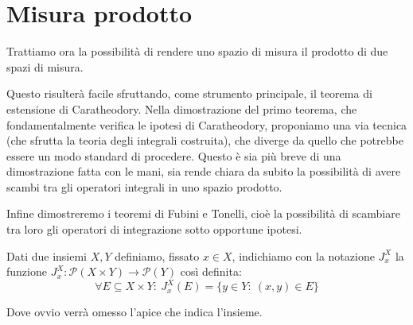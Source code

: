 \section{Misura prodotto}
Trattiamo ora la possibilità di rendere uno spazio di misura il prodotto di due spazi di misura. 

Questo risulterà facile sfruttando, come strumento principale, il teorema di estensione di Caratheodory. 
Nella dimostrazione del primo teorema, che fondamentalmente verifica le ipotesi di Caratheodory, proponiamo una via tecnica (che sfrutta la teoria degli integrali costruita), che diverge da quello che potrebbe essere un modo standard di procedere. Questo è sia più breve di una dimostrazione fatta con le mani, sia rende chiara da subito la possibilità di avere scambi tra gli operatori integrali in uno spazio prodotto. 

Infine dimostreremo i teoremi di Fubini e Tonelli, cioè la possibilità di scambiare tra loro gli operatori di integrazione sotto opportune ipotesi.

\begin{definition}
	Dati due insiemi $X,Y$ definiamo, fissato $x\in X$, indichiamo con la notazione $J^X_x$ la funzione $J^X_x:\mathcal P(X\times Y) \to \mathcal P(Y)$ così definita:
	\begin{equation*}
		\forall E\subseteq X\times Y:\ J^X_x(E)=\{y\in Y:\ (x,y)\in E\}
	\end{equation*}
	
	Dove ovvio verrà omesso l'apice che indica l'insieme.
\end{definition}



